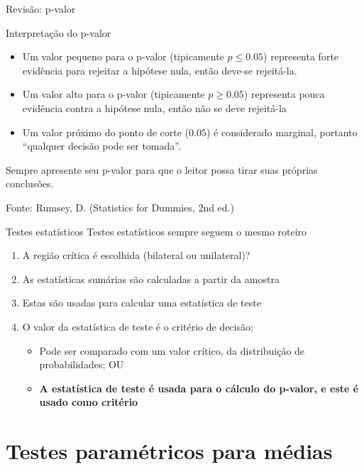 \documentclass{beamer}
\begin{document}
\begin{frame}{Revisão: p-valor}
\begin{block}{Interpretação do p-valor}
  \begin{itemize}
    \footnotesize
  \item Um valor pequeno para o p-valor (tipicamente $p \le 0.05$)
    representa forte evidência para rejeitar a hipótese nula, então
    deve-se rejeitá-la.
    \medskip
  \item Um valor alto para o p-valor (tipicamente $p \ge 0.05$)
    representa pouca evidência contra a hipótese nula, então não se
    deve rejeitá-la
    \medskip
  \item Um valor próximo do ponto de corte ($0.05$) é considerado
    marginal, portanto ``qualquer decisão pode ser tomada''.
  \end{itemize}
  \begin{block}{}
    \small
    \begin{center}
      Sempre apresente seu p-valor para que o leitor possa tirar suas
      próprias conclusões.
    \end{center}
  \end{block}
\end{block}
\vfill
{\hfill \scriptsize Fonte: Rumsey, D. (Statistics for Dummies, 2nd ed.)}
\end{frame}

\begin{frame}{Testes estatísticos}
  Testes estatísticos sempre seguem o mesmo roteiro
  \begin{enumerate}
  \small
  \item A região crítica é escolhida (bilateral ou unilateral)?
  \item As estatísticas sumárias são calculadas a partir da amostra
  \item Estas são usadas para calcular uma estatística de teste
  \item O valor da estatística de teste é o critério de decisão:
    \begin{itemize}
    \item Pode ser comparado com um valor crítico, da distribuição de probabilidades; OU
    \item {\bf A estatística de teste é usada para o cálculo do p-valor, e este é usado como critério}
    \end{itemize}
  \end{enumerate}
\end{frame}

\section{Testes paramétricos para médias}
\end{document}
